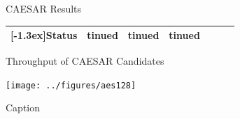\documentclass[xcolor=pdftex,dvipsnames,table,final]{beamer}
\newcommand{\rb}[1]{\raisebox{1.3ex}[-1.3ex]{#1}}
\begin{document}
\begin{frame}[fragile]{}
\begin{columns}[t]
\begin{column}{.31\linewidth}
\begin{block}{CAESAR Results}
\begin{center}
{\begin{tabular}{|r||c|c|c|c||c|c}
            \rowcolor{RoyalBlue!5}%
            \rb{\textbf{Status}}  &tinued    &tinued      &tinued         &              &              &               \\ \hline
          \end{tabular}
        }
        \end{center}
       \end{block}
       \begin{block}{Throughput of CAESAR Candidates}
        \vspace{-1ex}
         \begin{center}
           \texttt{[image: ../figures/aes128]}

           {\small Caption}
         \end{center}
       \end{block}
%          
%          
   \end{column}
\end{columns}

\end{frame}
\end{document}
